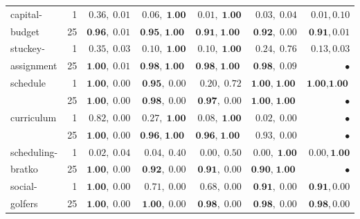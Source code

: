 \documentclass{article}
\renewcommand\[{\begin{equation}}
\renewcommand\]{\end{equation}}
\begin{document}
\begin{figure*}
\begin{minipage}{0.70\linewidth}
\begin{small}
\begin{tabular}{l|r|r|rr|rr}
        \midrule
        capital-                  & 1     & $0.36,\; 0.01$  & $0.06, \; \textbf{1.00}$ & $0.01, \; \textbf{1.00}$  & $0.03, \; 0.04$   & $0.01, 0.10$  \\
                                       budget & 25    & $\textbf{0.96},\; 0.01$  & $\textbf{0.95}, \; \textbf{1.00}$ & $\textbf{0.91}, \; \textbf{1.00}$  & $\textbf{0.92}, \; 0.00$   & $\textbf{0.91}, 0.01$  \\
        \midrule
        stuckey-              & 1     & $0.35,\; 0.03$  & $0.10, \; \textbf{1.00}$ & $0.10, \; \textbf{1.00}$  & $0.24, \; 0.76$   & $0.13, 0.03$  \\
                                      assignment  & 25    & $\textbf{1.00},\; 0.01$  & $\textbf{0.98}, \; \textbf{1.00}$ & $\textbf{0.98}, \; \textbf{1.00}$  & $\textbf{0.98}, \; 0.09$   & $\bullet$     \\
        \midrule
        schedule                        & 1     & $\textbf{1.00},\; 0.00$  & $\textbf{0.95}, \; 0.00$ & $0.20, \; 0.72$  & $\textbf{1.00}, \; \textbf{1.00}$   & $\textbf{1.00}, \textbf{1.00}$  \\
                                        & 25    & $\textbf{1.00},\; 0.00$  & $\textbf{0.98}, \; 0.00$ & $\textbf{0.97}, \; 0.00$  & $\textbf{1.00}, \; \textbf{1.00}$   & $\bullet$     \\
        \midrule
        curriculum                      & 1     & $0.82,\; 0.00$  & $0.27, \; \textbf{1.00}$ & $0.08, \; \textbf{1.00}$  & $0.02, \; 0.00$     & $\bullet$     \\
                                        & 25    & $\textbf{1.00},\; 0.00$  & $\textbf{0.96}, \; \textbf{1.00}$ & $\textbf{0.96}, \; \textbf{1.00}$  & $0.93, \; 0.00$     & $\bullet$     \\
        \midrule
        scheduling-                & 1     & $0.02,\; 0.04$  & $0.04, \; 0.40$ & $0.00, \; 0.50$  & $0.00, \; \textbf{1.00}$   & $0.00, \textbf{1.00}$  \\
                                      bratko  & 25    & $\textbf{1.00},\; 0.00$  & $\textbf{0.92}, \; 0.00$ & $\textbf{0.91}, \; 0.00$  & $\textbf{0.90}, \; \textbf{1.00}$   & $\bullet$     \\
        \midrule
        social-                   & 1     & $\textbf{1.00},\; 0.00$  & $0.71, \; 0.00$ & $0.68, \; 0.00$  & $\textbf{0.91}, \; 0.00$   & $\textbf{0.91}, 0.00$  \\
                                       golfers & 25    & $\textbf{1.00},\; 0.00$  & $\textbf{1.00}, \; 0.00$ & $\textbf{0.98}, \; 0.00$  & $\textbf{0.98}, \; 0.00$   & $\textbf{0.98}, 0.00$  \\

\end{tabular}
\end{small}
\end{minipage}
\end{figure*}
\end{document}
